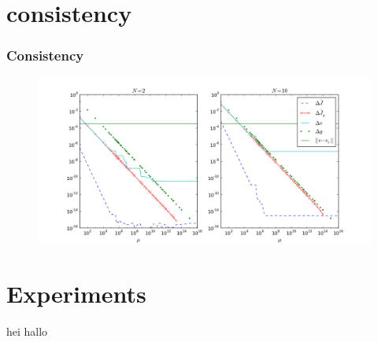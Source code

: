 \documentclass{beamer}
\begin{document}
\section{consistency}
\begin{frame}
\frametitle{Consistency}
\begin{figure}[!h]
\centering
\includegraphics[scale=0.4]{consistency1.png}

\end{figure}
\end{frame}
\section{Experiments}
\begin{frame}
hei hallo
\end{frame}
\end{document}
